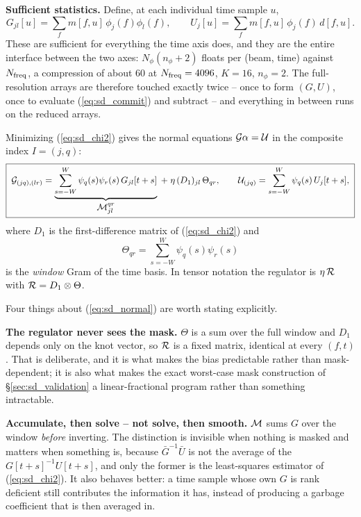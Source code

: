 \documentclass{article}
\numberwithin{equation}{section}   %
\begin{document}
{\bf Sufficient statistics.}  Define, at each individual time sample $u$,
\begin{equation}
G_{jl}[u] = \sum_f m[f,u]\,\phi_j(f)\phi_l(f),
\qquad
U_j[u] = \sum_f m[f,u]\,\phi_j(f)\,d[f,u] .
\label{eq:sd_GU}
\end{equation}
These are sufficient for everything the time axis does, and they are the entire interface between the two axes:
$N_\phi(n_\phi+2)$ floats per (beam, time) against $N_{\rm freq}$, a compression of about $60$ at
$N_{\rm freq} = 4096$, $K = 16$, $n_\phi = 2$.  The full-resolution arrays are therefore touched exactly twice
-- once to form $(G,U)$, once to evaluate (\ref{eq:sd_commit}) and subtract -- and everything in between runs
on the reduced arrays.

Minimizing (\ref{eq:sd_chi2}) gives the normal equations ${\cal G}\alpha = {\cal U}$ in the composite index
$I = (j,q)$:
\begin{equation}
\boxed{\;
{\cal G}_{(jq),(lr)} = \underbrace{\sum_{s=-W}^{W} \psi_q(s)\psi_r(s)\, G_{jl}[t+s]}_{\textstyle {\cal M}^{qr}_{jl}}
\;+\; \eta\,(D_1)_{jl}\,\Theta_{qr},
\qquad
{\cal U}_{(jq)} = \sum_{s=-W}^{W} \psi_q(s)\, U_j[t+s] ,
\;}
\label{eq:sd_normal}
\end{equation}
where $D_1$ is the first-difference matrix of (\ref{eq:sd_chi2}) and
\begin{equation}
\Theta_{qr} = \sum_{s=-W}^{W} \psi_q(s)\psi_r(s)
\label{eq:sd_theta}
\end{equation}
is the {\em window} Gram of the time basis.  In tensor notation the regulator is $\eta\,{\cal R}$ with
${\cal R} = D_1 \otimes \Theta$.

Four things about (\ref{eq:sd_normal}) are worth stating explicitly.

{\bf The regulator never sees the mask.}  $\Theta$ is a sum over the full window and $D_1$ depends only on the
knot vector, so ${\cal R}$ is a fixed matrix, identical at every $(f,t)$.  That is deliberate, and it is what
makes the bias predictable rather than mask-dependent; it is also what makes the exact worst-case mask
construction of \S\ref{sec:sd_validation} a linear-fractional program rather than something intractable.

{\bf Accumulate, then solve -- not solve, then smooth.}  ${\cal M}$ sums $G$ over the window {\em before}
inverting.  The distinction is invisible when nothing is masked and matters when something is, because
$\bar G^{-1}\bar U$ is not the average of the $G[t+s]^{-1}U[t+s]$, and only the former is the least-squares
estimator of (\ref{eq:sd_chi2}).  It also behaves better: a time sample whose own $G$ is rank deficient still
contributes the information it has, instead of producing a garbage coefficient that is then averaged in.
\end{document}
